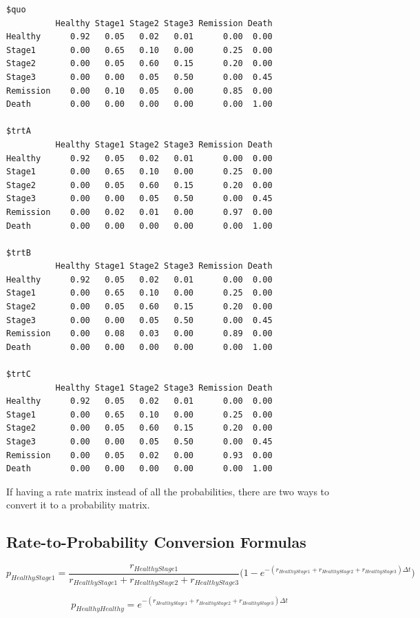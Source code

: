 \documentclass[
  letterpaper,
  DIV=11,
  numbers=noendperiod,
  oneside]{scrartcl}
\begin{document}
\begin{verbatim}
$quo
          Healthy Stage1 Stage2 Stage3 Remission Death
Healthy      0.92   0.05   0.02   0.01      0.00  0.00
Stage1       0.00   0.65   0.10   0.00      0.25  0.00
Stage2       0.00   0.05   0.60   0.15      0.20  0.00
Stage3       0.00   0.00   0.05   0.50      0.00  0.45
Remission    0.00   0.10   0.05   0.00      0.85  0.00
Death        0.00   0.00   0.00   0.00      0.00  1.00

$trtA
          Healthy Stage1 Stage2 Stage3 Remission Death
Healthy      0.92   0.05   0.02   0.01      0.00  0.00
Stage1       0.00   0.65   0.10   0.00      0.25  0.00
Stage2       0.00   0.05   0.60   0.15      0.20  0.00
Stage3       0.00   0.00   0.05   0.50      0.00  0.45
Remission    0.00   0.02   0.01   0.00      0.97  0.00
Death        0.00   0.00   0.00   0.00      0.00  1.00

$trtB
          Healthy Stage1 Stage2 Stage3 Remission Death
Healthy      0.92   0.05   0.02   0.01      0.00  0.00
Stage1       0.00   0.65   0.10   0.00      0.25  0.00
Stage2       0.00   0.05   0.60   0.15      0.20  0.00
Stage3       0.00   0.00   0.05   0.50      0.00  0.45
Remission    0.00   0.08   0.03   0.00      0.89  0.00
Death        0.00   0.00   0.00   0.00      0.00  1.00

$trtC
          Healthy Stage1 Stage2 Stage3 Remission Death
Healthy      0.92   0.05   0.02   0.01      0.00  0.00
Stage1       0.00   0.65   0.10   0.00      0.25  0.00
Stage2       0.00   0.05   0.60   0.15      0.20  0.00
Stage3       0.00   0.00   0.05   0.50      0.00  0.45
Remission    0.00   0.05   0.02   0.00      0.93  0.00
Death        0.00   0.00   0.00   0.00      0.00  1.00
\end{verbatim}

If having a rate matrix instead of all the probabilities, there are two
ways to convert it to a probability matrix.

\hypertarget{rate-to-probability-conversion-formulas}{%
\subsection{Rate-to-Probability Conversion
Formulas}\label{rate-to-probability-conversion-formulas}}

\[
p_{HealthyStage1}= \frac{r_{HealthyStage1}}{r_{HealthyStage1}+r_{HealthyStage2}+r_{HealthyStage3}}\big ( 1 - e^{-(r_{HealthyStage1}+r_{HealthyStage2}+r_{HealthyStage3})\Delta t}\big )
\]

\[
p_{HealthyHealthy} = e^{-(r_{HealthyStage1}+r_{HealthyStage2}+r_{HealthyStage3})\Delta t}
\]
\end{document}
